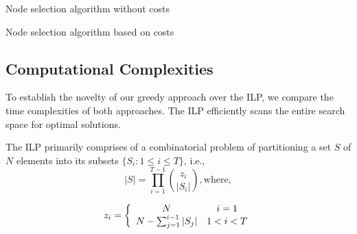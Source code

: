 \documentclass[conference]{IEEEtran}
\begin{document}
\begin{algorithm}
\caption{Node selection algorithm without costs}
\label{algo:node-selection-without-cost}
\begin{algorithmic}
\ENDFOR
\end{algorithmic}
\end{algorithm}

\begin{algorithm}
\caption{Node selection algorithm based on costs}
\label{algo:node-selection-with-cost}
\begin{algorithmic}
\ENDFOR
{}
	\ELSE
	\ENDIF
\ENDFOR
\end{algorithmic}
\end{algorithm}

\subsection{Computational Complexities}

\par To establish the novelty of our greedy approach over the ILP, we compare
the time complexities of both approaches. The ILP efficiently scans the entire
search space for optimal solutions. 

\par The ILP primarily comprises of a
combinatorial problem of partitioning a set $S$ of $N$ elements into its
subsets $\{S_i: 1 \leq i \leq T\}$, i.e., 
$$ |S| =
\prod_{i=1}^{T-1} \binom{z_i}{|S_i|}, \text{where}, 
$$

$$
z_i=
\left\{\begin{array}{c c}
N & i=1\\
N-\sum_{j=1}^{i-1}|S_j| & 1 < i < T \\
\end{array} \right.
$$
\end{document}
